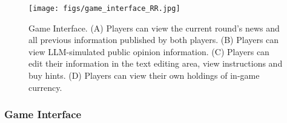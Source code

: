 \begin{figure}[htbp]
    \centering
    \texttt{[image: figs/game\_interface\_RR.jpg]}
    \caption{Game Interface. (A) Players can view the current round's news and all previous information published by both players. (B) Players can view LLM-simulated public opinion information. (C) Players can edit their information in the text editing area, view instructions and buy hints. (D) Players can view their own holdings of in-game currency.}
    \label{fig:interface}
\end{figure}

\subsubsection{Game Interface}


